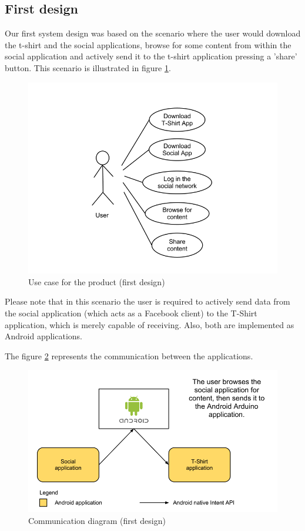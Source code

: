 \subsection{First design}
Our first system design was based on the scenario where the user would download the t-shirt
and the social applications, browse for some content from within the social application
and actively send it to the t-shirt application pressing a 'share' button.
This scenario is illustrated in figure \ref{fig:design-usecase1}.

\begin{figure}[h!]
\centering \includegraphics[scale=0.35]{img/design-usecase1}
\caption{Use case for the product (first design)}
\label{fig:design-usecase1}
\end{figure}

Please note that in this scenario the user is required to actively send data from
the social application (which acts as a Facebook client) to the T-Shirt application,
which is merely capable of receiving. Also, both are implemented as Android applications.



The figure \ref{fig:design-resp} represents the communication between the applications.

\begin{figure}[h!]
\centering \includegraphics[scale=0.35]{img/design-resp.png}
\caption{Communication diagram (first design)}
\label{fig:design-resp}
\end{figure}


